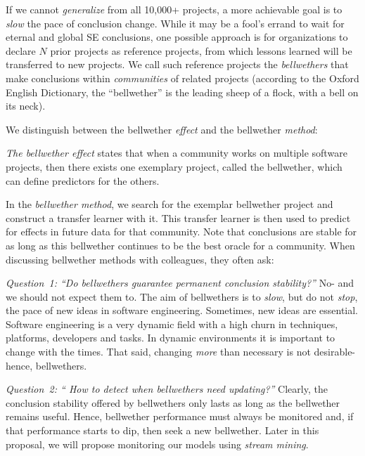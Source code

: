  

If we cannot {\em generalize} 
from all 10,000+ projects, a more achievable goal is to {\em
slow} the pace of conclusion change.
While it may be a fool's errand to wait for eternal and global SE conclusions, one possible approach is for organizations to declare $N$ prior projects as 
 reference projects, from which lessons learned will be transferred to new projects. 
 We call such reference projects the {\em bellwethers}
that make conclusions 
within {\em communities} of related projects (according to the Oxford English Dictionary, the
``bellwether'' is the leading sheep of a flock, with a bell on its neck).

We  distinguish between the bellwether {\em effect}
and the bellwether {\em  method}:
\bi
\item \textit{The bellwether effect} states that when a community works on 
multiple software projects, then  there exists one exemplary project, called the bellwether,
which can define   predictors for the others.
\item In the \textit{bellwether method}, we search for the exemplar bellwether project and construct a transfer learner with it. This transfer learner is then used to predict for effects in future data for that community.
\ei
 Note that conclusions are stable
for as long as this bellwether continues to be the best oracle for a community. 
When discussing bellwether methods with colleagues, they often ask:
\bi
\item
{\em Question~1: ``Do bellwethers guarantee permanent conclusion stability?''} No- and we should not expect them to. The aim of bellwethers is to {\em slow}, but do not  {\em stop}, the pace of new ideas in software engineering. Sometimes, new ideas are essential. Software engineering is a very dynamic field with a high churn in techniques, platforms, developers and tasks. In  dynamic environments it is important to change with the times. That said, changing {\em more} than necessary is not desirable- hence, bellwethers. 
\item
{\em Question~2: `` How to detect when bellwethers need updating?''} 
Clearly, the conclusion stability offered by bellwethers only lasts as long as the bellwether remains useful. Hence, bellwether performance must always be monitored and, if that performance starts to dip, then seek a new bellwether. Later in this proposal, we will propose monitoring our models using {\em stream mining}. 
\ei
